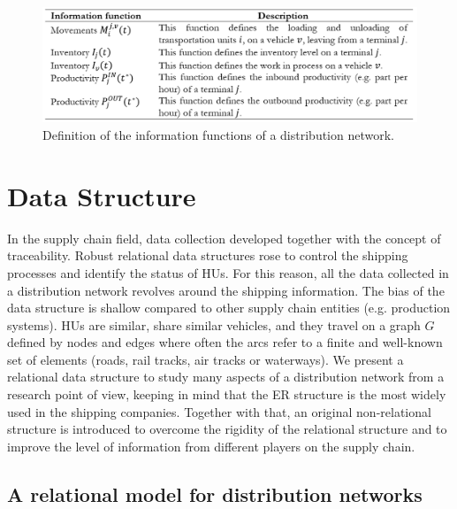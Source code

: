 \begin{figure}[hbt!]
\centering
\includegraphics[width=1\textwidth]{SectionDistribution/diagnosticModels_figures/tab_information_functions_dist.png}
\captionsetup{type=table}
\caption{Definition of the information functions of a distribution network.}
\label{tab_information_functions_dist}
\end{figure}

\section{Data Structure}
In the supply chain field, data collection developed together with the concept of traceability. Robust relational data structures rose to control the shipping processes and identify the status of HUs. For this reason, all the data collected in a distribution network revolves around the shipping information. The bias of the data structure is shallow compared to other supply chain entities (e.g. production systems). HUs are similar, share similar vehicles, and they travel on a graph $G$ defined by nodes and edges where often the arcs refer to a finite and well-known set of elements (roads, rail tracks, air tracks or waterways). We present a relational data structure to study many aspects of a distribution network from a research point of view, keeping in mind that the ER structure is the most widely used in the shipping companies. Together with that, an original non-relational structure is introduced to overcome the rigidity of the relational structure and to improve the level of information from different players on the supply chain.

\subsection{A relational model for distribution networks} \label{secRelationalModelDist}

